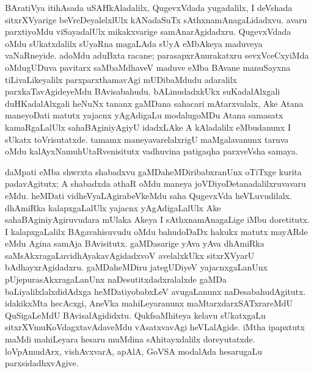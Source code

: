 BAratiVya itihAsada uSAHkAladalilx, QugevxVdada yugadalilx, I deVshada sitxrXVyarige beVreDeyalelxlUlx kANadaSuTx sAthxnamAnagaLidadxvu. avaru parxtiyoMdu viSayadalUlx mikakxvarige samAnarAgidadxru. QugevxVdada oMdu sUkatxdalilx sUyaRna magaLAda sUyA eMbAkeya maduveya vaNaRneyide. adoMdu aduBxta racane; parasapxrAnurakatxru sevxVceCxyiMda oMdugUDuva pavitarx saMbaMdhaveV maduve eMba BAvane manuSayxna tiLivaLikeyalilx parxparxthamavAgi mUDibaMdudu adaralilx parxkaTavAgideyeMdu BAvisabahudu. bALinudadxkUkx suKadalAlxgali duHKadalAlxgali heNuNx tananx gaMDana sahacari mAtarxvalalx, Ake Atana maneyoDati matutx yajacnx yAgAdigaLu modalugoMDu Atana samasatx kamaRgaLalUlx sahaBAginiyAgiyU idadxLAke A kAladalilx eMbudanunx I sUkatx toVrisutatxde. tamamx maneyavarelalxrigU maMgalavanunx taruva oMdu kalAyxNamuhUtaRvenisitutx vadhuvina patigaqha parxveVsha samaya.

daMpati eMba shwrxta shabadxvu gaMDaheMDiribabxranUnx oTiTxge kurita padavAgitutx; A shabadxda athaR oMdu maneya joVDiyoDetanadalilxruvavaru eMdu. heMDati vidheVya\-LAgirabeVkeMdu saha QugevxVda heVLuvudilalx. dhAmiRka kalapxgaLalUlx yajacnx yAgAdi\-gaLalUlx Ake sahaBAginiyAgiruvudara mUlaka Akeya I sAthxnamAnagaLige iMbu doretitutx. I kalapxgaLalilx BAgavahisuvudu oMdu bahudoDaDx hakukx matutx mayARde eMdu Agina samAja BAvisitutx. gaMDasarige yAva yAva dhAmiRka saMsAkxragaLu\break vidhAyakavAgidadxvoV avelalxkUkx sitxrXVyarU bAdhayxrAgidadxru. gaMDaheMDiru jate\break\-gUDiyeV yajacnxgaLanUnx pUjepurasAkxragaLanUnx naDesutitxdadxralalxde gaMDa baLiyalilxlalx\-didAdxga heMDatiyobabxLeV avugaLanunx naDesabahudAgitutx. idakikxMta hecAcxgi, AneVka mahiLeyaranunx maMtarxdarxSATxrareMdU QuSigaLeMdU BAvisalAgididxtu. QukfsaMhiteya kelavu sUkatxgaLu sitxrXVmuKoVdagxtavAdaveMdu vAsatxvavAgi heVLalAgide. iMtha \hbox{ipapxtutx} maMdi mahiLeyara hesaru muMdina sAhitayxdalilx doreyutatxde. loVpAmudArx, vishAvxvarA, apAlA, GoVSA modalAda hesarugaLu parxsidadhxvAgive.

